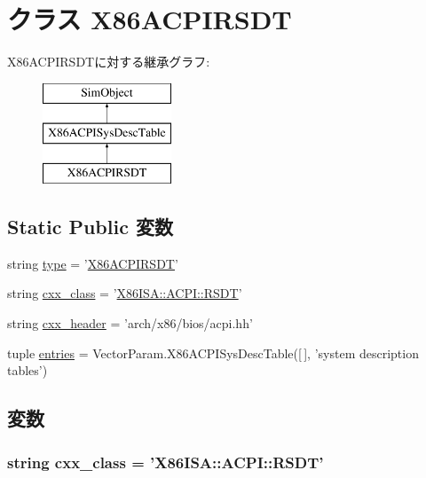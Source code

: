 \hypertarget{classACPI_1_1X86ACPIRSDT}{
\section{クラス X86ACPIRSDT}
\label{classACPI_1_1X86ACPIRSDT}
}
X86ACPIRSDTに対する継承グラフ:\begin{figure}[H]
\begin{center}
\leavevmode
\includegraphics[height=3cm]{classACPI_1_1X86ACPIRSDT}
\end{center}
\end{figure}
\subsection*{Static Public 変数}
\begin{DoxyCompactItemize}
\item 
string \hyperlink{classACPI_1_1X86ACPIRSDT_acce15679d830831b0bbe8ebc2a60b2ca}{type} = '\hyperlink{classACPI_1_1X86ACPIRSDT}{X86ACPIRSDT}'
\item 
string \hyperlink{classACPI_1_1X86ACPIRSDT_a58cd55cd4023648e138237cfc0822ae3}{cxx\_\-class} = '\hyperlink{classX86ISA_1_1ACPI_1_1RSDT}{X86ISA::ACPI::RSDT}'
\item 
string \hyperlink{classACPI_1_1X86ACPIRSDT_a17da7064bc5c518791f0c891eff05fda}{cxx\_\-header} = 'arch/x86/bios/acpi.hh'
\item 
tuple \hyperlink{classACPI_1_1X86ACPIRSDT_aa7b3bf5cf82e2cb9b7cea7a35c454576}{entries} = VectorParam.X86ACPISysDescTable(\mbox{[}$\,$\mbox{]}, 'system description tables')
\end{DoxyCompactItemize}


\subsection{変数}
\hypertarget{classACPI_1_1X86ACPIRSDT_a58cd55cd4023648e138237cfc0822ae3}{
\subsubsection[{cxx\_\-class}]{\setlength{\rightskip}{0pt plus 5cm}string {\bf cxx\_\-class} = '{\bf X86ISA::ACPI::RSDT}'}}
\label{classACPI_1_1X86ACPIRSDT_a58cd55cd4023648e138237cfc0822ae3}


